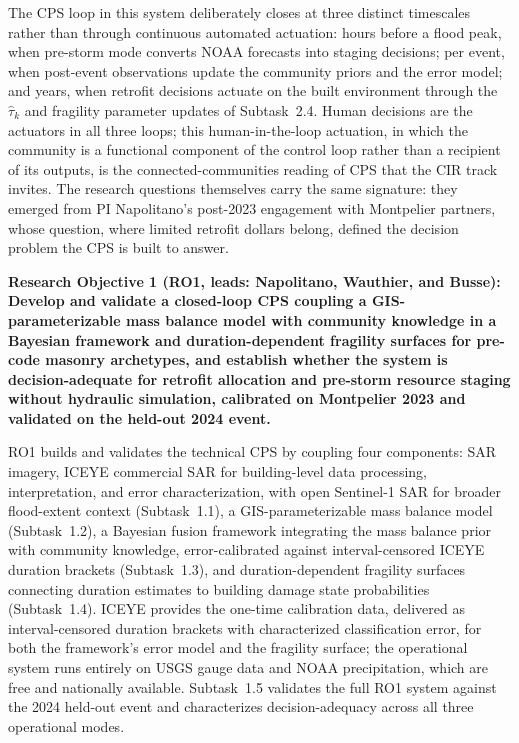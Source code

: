 \documentclass[11pt]{article}
\begin{document}
The CPS loop in this system deliberately closes at three distinct timescales rather
than through continuous automated actuation: hours before a flood peak, when
pre-storm mode converts NOAA forecasts into staging decisions; per event, when
post-event observations update the community priors and the error model; and years,
when retrofit decisions actuate on the built environment through the
$\hat{\tau}_k$ and fragility parameter updates of Subtask~2.4.
Human decisions are the actuators in all three loops; this human-in-the-loop
actuation, in which the community is a functional component of the control loop
rather than a recipient of its outputs, is the connected-communities reading of
CPS that the CIR track invites.
The research questions themselves carry the same signature: they emerged from
PI Napolitano's post-2023 engagement with Montpelier partners, whose question,
where limited retrofit dollars belong, defined the decision problem the CPS is
built to answer.

\begin{tcolorbox}[colback=mycmykcolor,colframe=black,boxrule=1pt,coltext=black,
  left=1mm,right=1mm,top=1mm,bottom=1mm]
\textbf{Research Objective 1 (RO1, leads: Napolitano, Wauthier, and Busse):
Develop and validate a closed-loop CPS coupling a GIS-parameterizable mass balance
model with community knowledge in a Bayesian framework and duration-dependent
fragility surfaces for pre-code masonry archetypes, and establish whether the system
is decision-adequate for retrofit allocation and pre-storm resource staging without
hydraulic simulation, calibrated on Montpelier 2023 and validated on the held-out
2024 event.}
\end{tcolorbox}

RO1 builds and validates the technical CPS by coupling four components: SAR imagery,
ICEYE commercial SAR for building-level data processing, interpretation,
and error characterization, with open Sentinel-1 SAR for broader flood-extent
context (Subtask~1.1), a
GIS-parameterizable mass balance model (Subtask~1.2), a Bayesian fusion framework
integrating the mass balance prior with community knowledge, error-calibrated
against interval-censored ICEYE duration brackets (Subtask~1.3), and duration-dependent fragility surfaces connecting
duration estimates to building damage state probabilities (Subtask~1.4).
ICEYE provides the one-time calibration data, delivered as interval-censored
duration brackets with characterized classification error, for both the framework's
error model and the fragility surface; the operational system runs entirely on USGS
gauge data and NOAA precipitation, which are free and nationally available.
Subtask~1.5 validates the full RO1 system against the 2024 held-out event and
characterizes decision-adequacy across all three operational modes.
\end{document}
